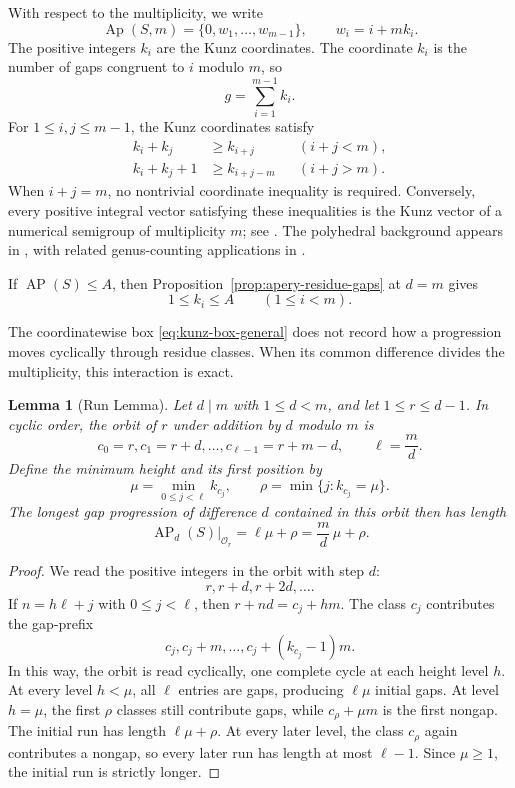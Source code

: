\documentclass[11pt]{article}
\theoremstyle{plain}
\newtheorem{lemma}[theorem]{Lemma}
\theoremstyle{definition}
\theoremstyle{remark}
\newcommand{\Ap}{\operatorname{Ap}}
\newcommand{\AP}{\operatorname{AP}}
\begin{document}
With respect to the multiplicity, we write
\[
  \Ap(S,m)=\{0,w_1,\ldots,w_{m-1}\},
  \qquad w_i=i+mk_i.
\]
The positive integers $k_i$ are the Kunz coordinates.  The coordinate $k_i$
is the number of gaps congruent to $i$ modulo $m$, so
\begin{equation}\label{eq:kunz-genus}
  g=\sum_{i=1}^{m-1}k_i.
\end{equation}
For $1\leq i,j\leq m-1$, the Kunz coordinates satisfy
\begin{align}
  k_i+k_j&\geq k_{i+j} &&(i+j<m),\label{eq:kunz-unwrapped}\\
  k_i+k_j+1&\geq k_{i+j-m} &&(i+j>m).\label{eq:kunz-wrapped}
\end{align}
When $i+j=m$, no nontrivial coordinate inequality is required.  Conversely,
every positive integral vector satisfying these inequalities is the Kunz
vector of a numerical semigroup of multiplicity $m$; see
\cite{rosales-garcia-sanchez}.  The polyhedral background appears in
\cite{kaplan-oneill-group-cone,brower-mcdonough-oneill-kunz-fan}, with
related genus-counting applications in \cite{bernardini-kunz}.

If $\AP(S)\leq A$, then Proposition~\ref{prop:apery-residue-gaps} at $d=m$
gives
\begin{equation}\label{eq:kunz-box-general}
  1\leq k_i\leq A
  \qquad(1\leq i<m).
\end{equation}

The coordinatewise box \eqref{eq:kunz-box-general} does not record how a
progression moves cyclically through residue classes.  When its common
difference divides the multiplicity, this interaction is exact.

\begin{lemma}[Run Lemma]\label{lem:run}
Let $d\mid m$ with $1\leq d<m$, and let $1\leq r\leq d-1$.  In cyclic
order, the orbit of $r$ under addition by $d$ modulo $m$ is
\[
  c_0=r,c_1=r+d,\ldots,c_{\ell-1}=r+m-d,
  \qquad \ell=\frac md.
\]
Define the minimum height and its first position by
\[
  \mu=\min_{0\leq j<\ell}k_{c_j},
  \qquad \rho=\min\{j:k_{c_j}=\mu\}.
\]
The longest gap progression of difference $d$ contained in this orbit then
has length
\[
  \boxed{\AP_d(S)|_{\mathcal O_r}=\ell\mu+\rho
  =\frac md\,\mu+\rho.}
\]
\end{lemma}

\begin{proof}
We read the positive integers in the orbit with step $d$:
\[
  r,r+d,r+2d,\ldots.
\]
If $n=h\ell+j$ with $0\leq j<\ell$, then
$r+nd=c_j+hm$.  The class $c_j$ contributes the gap-prefix
\[
  c_j,c_j+m,\ldots,c_j+(k_{c_j}-1)m.
\]
In this way, the orbit is read cyclically, one complete cycle at each height
level $h$.  At every level $h<\mu$, all $\ell$ entries are gaps, producing
$\ell\mu$ initial gaps.  At level $h=\mu$, the first $\rho$ classes still
contribute gaps, while $c_\rho+\mu m$ is the first nongap.  The initial run
has length $\ell\mu+\rho$.  At every later level, the class $c_\rho$ again
contributes a nongap, so every later run has length at most $\ell-1$.  Since
$\mu\geq1$, the initial run is strictly longer.
\end{proof}
\end{document}

